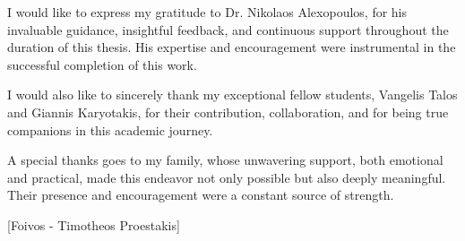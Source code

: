 \documentclass[a4paper,12pt]{report}
\begin{document}
I would like to express my gratitude to Dr. Nikolaos Alexopoulos, for his invaluable guidance, insightful feedback,
and continuous support throughout the duration of this thesis. His expertise and
encouragement were instrumental in the successful completion of this work.

I would also like to sincerely thank my exceptional fellow students, Vangelis Talos
and Giannis Karyotakis, for their contribution, collaboration, and for being true companions
in this academic journey.

A special thanks goes to my family, whose unwavering support, both emotional and practical,
made this endeavor not only possible but also deeply meaningful. Their presence and
encouragement were a constant source of strength.

\vspace{1cm}
\noindent
[\today] \hfill [Foivos - Timotheos Proestakis]

\clearpage

\tableofcontents
\clearpage


\end{document}
